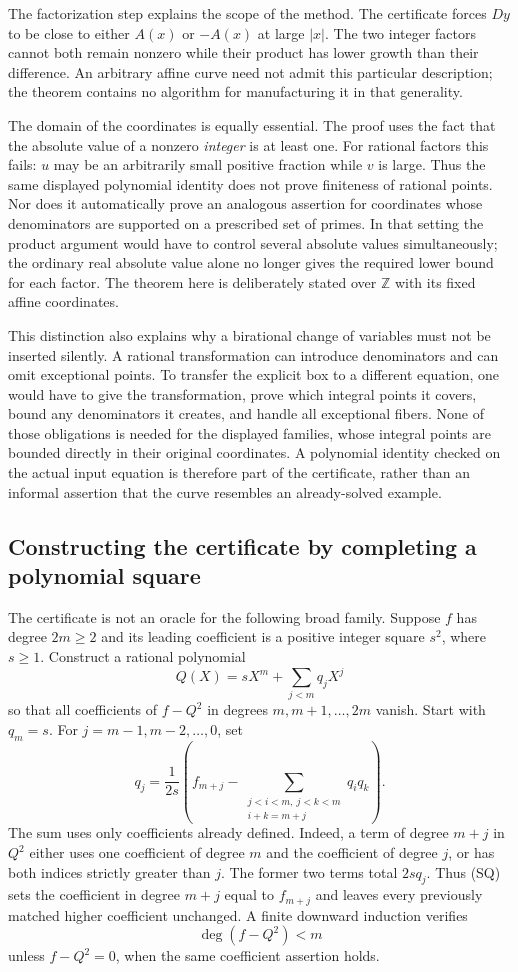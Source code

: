 The factorization step explains the scope of the method.  The certificate
forces $Dy$ to be close to either $A(x)$ or $-A(x)$ at large $|x|$.  The two
integer factors cannot both remain nonzero while their product has lower
growth than their difference.  An arbitrary affine curve need not admit
this particular description; the theorem contains no algorithm for
manufacturing it in that generality.

The domain of the coordinates is equally essential.  The proof uses the
fact that the absolute value of a nonzero \emph{integer} is at least one.
For rational factors this fails: $u$ may be an arbitrarily small positive
fraction while $v$ is large.  Thus the same displayed polynomial identity
does not prove finiteness of rational points.  Nor does it automatically
prove an analogous assertion for coordinates whose denominators are
supported on a prescribed set of primes.  In that setting the product
argument would have to control several absolute values simultaneously;
the ordinary real absolute value alone no longer gives the required
lower bound for each factor.  The theorem here is deliberately stated
over $\mathbb Z$ with its fixed affine coordinates.

This distinction also explains why a birational change of variables must
not be inserted silently.  A rational transformation can introduce
denominators and can omit exceptional points.  To transfer the explicit
box to a different equation, one would have to give the transformation,
prove which integral points it covers, bound any denominators it creates,
and handle all exceptional fibers.  None of those obligations is needed
for the displayed families, whose integral points are bounded directly in
their original coordinates.  A polynomial identity checked on the actual
input equation is therefore part of the certificate, rather than an
informal assertion that the curve resembles an already-solved example.

\subsection{Constructing the certificate by completing a polynomial square}

The certificate is not an oracle for the following broad family.  Suppose
$f$ has degree $2m\geq2$ and its leading coefficient is a positive integer
square $s^2$, where $s\geq1$.  Construct a rational polynomial
\[
                      Q(X)=sX^m+\sum_{j<m}q_jX^j
\]
so that all coefficients of $f-Q^2$ in degrees $m,m+1,\ldots,2m$ vanish.
Start with $q_m=s$.  For $j=m-1,m-2,\ldots,0$, set
\[
 q_j=\frac{1}{2s}
 \left(f_{m+j}-
   \sum_{\substack{j<i<m,\ j<k<m\\i+k=m+j}}q_iq_k\right).
\tag{SQ}
\]
The sum uses only coefficients already defined.  Indeed, a term of degree
$m+j$ in $Q^2$ either uses one coefficient of degree $m$ and the coefficient
of degree $j$, or has both indices strictly greater than $j$.  The former
two terms total $2s q_j$.  Thus (SQ) sets the coefficient in degree $m+j$
equal to $f_{m+j}$ and leaves every previously matched higher coefficient
unchanged.  A finite downward induction verifies
\[
                         \deg(f-Q^2)<m
\]
unless $f-Q^2=0$, when the same coefficient assertion holds.

